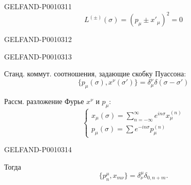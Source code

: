 \begin{GelfandAdjacentEvidence}{GELFAND-P001031}{1}
\begin{equation*}
L^{(\pm)}(\sigma)=(p_\mu\pm x'_\mu)^2=0
\tag{7}
\end{equation*}
\end{GelfandAdjacentEvidence}
\begin{GelfandAdjacentEvidence}{GELFAND-P001031}{2}

\end{GelfandAdjacentEvidence}
\begin{GelfandAdjacentEvidence}{GELFAND-P001031}{3}


Станд. коммут. соотношения, задающие скобку Пуассона:
\begin{equation*}
\{p_\mu(\sigma),x^\nu(\sigma')\}=\delta^\nu_\mu\delta(\sigma-\sigma')
\tag{8}
\end{equation*}

Рассм. разложение Фурье $x^\nu$ и $p_\mu$:
\begin{equation*}
\begin{cases}
x_\mu(\sigma)=\displaystyle\sum_{n=-\infty}^{\infty}e^{in\sigma}x_\mu^{(n)}\\[.5ex]
p_\mu(\sigma)=\displaystyle\sum e^{-in\sigma}p_\mu^{(n)}
\end{cases}
\tag{9}
\end{equation*}
\end{GelfandAdjacentEvidence}
\begin{GelfandAdjacentEvidence}{GELFAND-P001031}{4}


Тогда
\begin{equation*}
\{p^\mu_n,x_{m\nu}\}=\delta^\mu_\nu\delta_{0,n+m}.
\tag{10}
\end{equation*}
\end{GelfandAdjacentEvidence}

